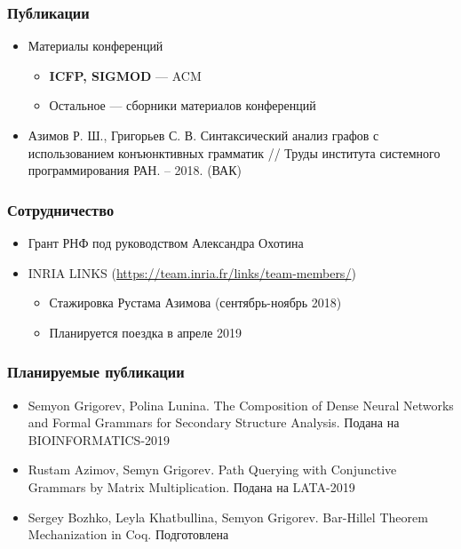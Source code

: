 \documentclass[xcolor=table]{beamer}
\begin{document}
\begin{frame}[fragile]
  \transwipe[direction=90]
  \frametitle{Публикации}
\begin{itemize}
      \item Материалы конференций
        \begin{itemize}
          \item \textbf{ICFP, SIGMOD} --- ACM
          \item Остальное --- сборники материалов конференций
        \end{itemize}
      \item Азимов Р. Ш., Григорьев С. В. Синтаксический анализ графов с использованием конъюнктивных грамматик // Труды института системного программирования РАН. – 2018. (ВАК)
\end{itemize}
\end{frame}

\begin{frame}[fragile]
  \transwipe[direction=90]
  \frametitle{Сотрудничество}
\begin{itemize}
      \item Грант РНФ под руководством Александра Охотина
      \item INRIA LINKS (\url{https://team.inria.fr/links/team-members/})
      \begin{itemize}
         \item Стажировка Рустама Азимова (сентябрь-ноябрь 2018)
         \item Планируется поездка в апреле 2019
      \end{itemize}
      
\end{itemize}
\end{frame}

\begin{frame}[fragile]
  \transwipe[direction=90]
  \frametitle{Планируемые публикации}
\begin{itemize}
      \item Semyon Grigorev, Polina Lunina. The Composition of Dense Neural Networks and Formal Grammars for Secondary Structure Analysis. Подана на BIOINFORMATICS-2019
      \item Rustam Azimov, Semyn Grigorev. Path Querying with Conjunctive Grammars by Matrix Multiplication. Подана на LATA-2019
      \item Sergey Bozhko, Leyla Khatbullina, Semyon Grigorev. Bar-Hillel Theorem Mechanization in Coq. Подготовлена
\end{itemize}
\end{frame}
\end{document}
